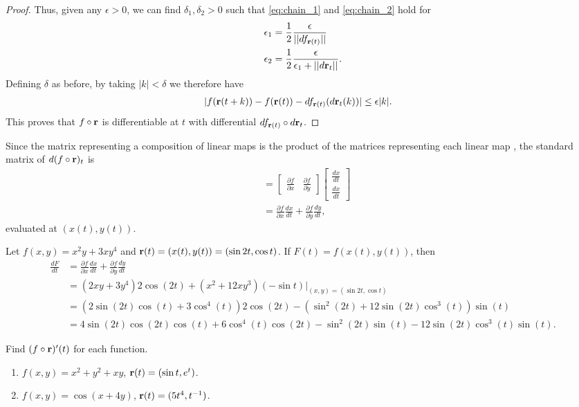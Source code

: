 \documentclass[12pt,letterpaper,reqno]{article}
\numberwithin{equation}{section}
\newcommand{\bbr}{{\bf r}}
\newcommand{\fixme}[1]{{\color{orange}{[#1]}}}
\begin{document}
{\begin{proof}
Thus, given any $\epsilon>0$, we can find $\delta_1,\delta_2>0$ such that \eqref{eq:chain_1} and \eqref{eq:chain_2} hold for 
\begin{align*}
	\epsilon_1&=\frac{1}{2}\frac{\epsilon}{||df_{\bbr(t)}||} \\
	\epsilon_2&=\frac{1}{2}\frac{\epsilon}{\epsilon_1+||d\bbr_t||}.
\end{align*}
Defining $\delta$ as before, by taking $|k|<\delta$ we therefore have
\begin{align*}
	|f(\bbr(t+k))-f(\bbr(t))-df_{\bbr(t)}(d\bbr_t(k))|&\leq \epsilon|k|.
\end{align*}
This proves that $f \circ \bbr$ is differentiable at $t$ with differential $df_{\bbr(t)} \circ d\bbr_t$.
\end{proof}

Since the matrix representing a composition of linear maps is the product of the matrices representing each linear map \fixme{Refer to my Linear Algebra notes}, the standard matrix of $d(f \circ \bbr)_{t}$ is
\begin{align*}
	[d(f \circ \bbr)_{t}]&=\begin{bmatrix}
		\frac{\partial f}{\partial x} & \frac{\partial f}{\partial y} 
	\end{bmatrix} \begin{bmatrix}
		\frac{dx}{dt} \\ \frac{dx}{dt}
	\end{bmatrix} \\
	&=\frac{\partial f}{\partial x}\frac{dx}{dt}+\frac{\partial f}{\partial y}\frac{dy}{dt},
\end{align*}
evaluated at $(x(t),y(t))$.

\begin{example}
Let $f(x,y)=x^2y+3xy^4$ and $\bbr(t)=(x(t),y(t))=(\sin 2t, \cos t)$. If $F(t)=f(x(t),y(t))$, then
\begin{align*}
	\frac{dF}{dt}&=\frac{\partial f}{\partial x}\frac{dx}{dt}+\frac{\partial f}{\partial y}\frac{dy}{dt} \\
	&=(2xy+3y^4)2\cos(2t)+(x^2+12xy^3)(-\sin t)|_{(x,y)=(\sin 2t, \cos t)} \\
	&=(2\sin(2t)\cos(t)+3\cos^4(t))2\cos(2t)-(\sin^2(2t)+12\sin(2t)\cos^3(t))\sin(t) \\
	&=4\sin(2t)\cos(2t)\cos(t)+6\cos^4(t)\cos(2t)-\sin^2(2t)\sin(t)-12\sin(2t)\cos^3(t)\sin(t).
\end{align*}	
\end{example}

\begin{exercise}
Find $(f \circ \bbr)'(t)$ for each function.
\begin{enumerate}[(1)]
	\item $f(x,y)=x^2+y^2+xy$, $\bbr(t)=(\sin t,e^t)$.
	\item $f(x,y)=\cos(x+4y)$, $\bbr(t)=(5t^4,t^{-1})$.
\end{enumerate}	
\end{exercise}


}
\end{document}
